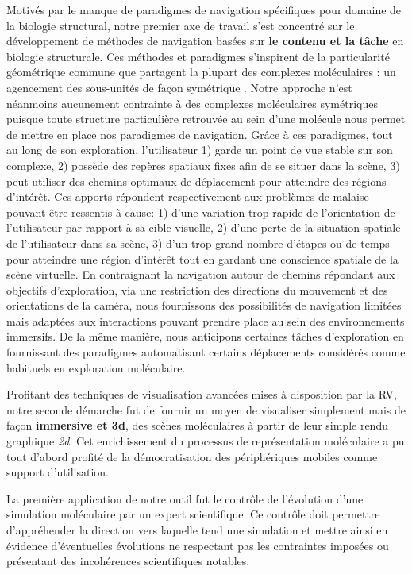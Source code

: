 Motivés par le manque de paradigmes de navigation spécifiques pour domaine de la biologie structural, notre premier axe de travail s'est concentré sur le développement de méthodes de navigation basées sur \textbf{le contenu et la tâche} en biologie structurale. Ces méthodes et paradigmes s'inspirent de la particularité géométrique commune que partagent la plupart des complexes moléculaires : un agencement des sous-unités de façon symétrique \cite{goodsell_structural_2000}. Notre approche n'est néanmoins aucunement contrainte à des complexes moléculaires symétriques puisque toute structure particulière retrouvée au sein d'une molécule nous permet de mettre en place nos paradigmes de navigation. Grâce à ces paradigmes, tout au long de son exploration, l'utilisateur 1) garde un point de vue stable sur son complexe, 2) possède des repères spatiaux fixes afin de se situer dans la scène, 3) peut utiliser des chemins optimaux de déplacement pour atteindre des régions d’intérêt. Ces apports répondent respectivement aux problèmes de malaise pouvant être ressentis à cause: 1) d'une variation trop rapide de l'orientation de l'utilisateur par rapport à sa cible visuelle, 2) d'une perte de la situation spatiale de l'utilisateur dans sa scène, 3) d'un trop grand nombre d'étapes ou de temps pour atteindre une région d'intérêt tout en gardant une conscience spatiale de la scène virtuelle. En contraignant la navigation autour de chemins répondant aux objectifs d'exploration, via une restriction des directions du mouvement et des orientations de la caméra, nous fournissons des possibilités de navigation limitées mais adaptées aux interactions pouvant prendre place au sein des environnements immersifs. De la même manière, nous anticipons certaines tâches d'exploration en fournissant des paradigmes automatisant certains déplacements considérés comme habituels en exploration moléculaire.


Profitant des techniques de visualisation avancées mises à disposition par la RV, notre seconde démarche fut de fournir un moyen de visualiser simplement mais de façon \textbf{immersive et 3d}, des scènes moléculaires à partir de leur simple rendu graphique \textit{2d}. Cet enrichissement du processus de représentation moléculaire a pu tout d'abord profité de la démocratisation des périphériques mobiles comme support d'utilisation.

La première application de notre outil fut le contrôle de l'évolution d'une simulation moléculaire par un expert scientifique. Ce contrôle doit permettre d'appréhender la direction vers laquelle tend une simulation et mettre ainsi en évidence d'éventuelles évolutions ne respectant pas les contraintes imposées ou présentant des incohérences scientifiques notables. 

